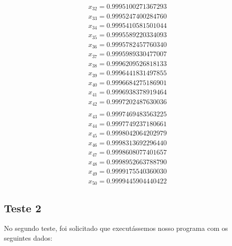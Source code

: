 \begin{multicols}{3}
\begin{align*}
		x_{32} = 0.9995100271367293\\
		x_{33} = 0.9995247400284760\\
		x_{34} = 0.9995410581501044\\
		x_{35} = 0.9995589220334093\\
		x_{36} = 0.9995782457760340\\
		x_{37} = 0.9995989330477007\\
		x_{38} = 0.9996209526818133\\
		x_{39} = 0.9996441831497855\\
		x_{40} = 0.9996684275186901\\
		x_{41} = 0.9996938378919464\\
		x_{42} = 0.9997202487630036\\
	\end{align*}
	\vfill
	\columnbreak
	\begin{align*}
		x_{43} = 0.9997469483563225\\
		x_{44} = 0.9997749237180661\\
		x_{45} = 0.9998042064202979\\
		x_{46} = 0.9998313692296440\\
		x_{47} = 0.9998608077401657\\
		x_{48} = 0.9998952663788790\\
		x_{49} = 0.9999175540360030\\
		x_{50} = 0.9999445904440422
	\end{align*}
\end{multicols}

\subsection{Teste 2}
No segundo teste, foi solicitado que executássemos nosso programa com os seguintes dados:

